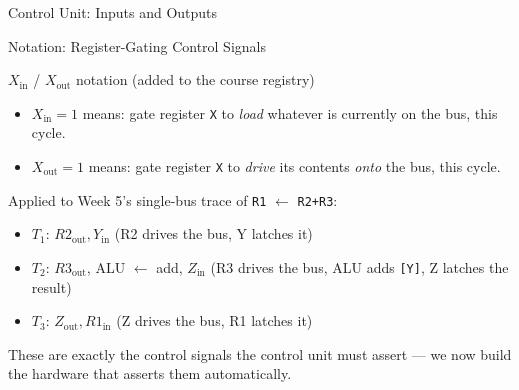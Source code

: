 \documentclass[aspectratio=169]{beamer}
\begin{document}
\begin{frame}{Control Unit: Inputs and Outputs}
\begin{center}
  \end{center}
  \cite{Hamacher2002_computer_organization}
\end{frame}

\begin{frame}{Notation: Register-Gating Control Signals}
  \begin{block}{$X_{\text{in}}$ / $X_{\text{out}}$ notation (added to the course registry)}
    \begin{itemize}
      \item $X_{\text{in}} = 1$ \quad means: gate register \texttt{X} to \emph{load} whatever
        is currently on the bus, this cycle.
      \item $X_{\text{out}} = 1$ \quad means: gate register \texttt{X} to \emph{drive} its
        contents \emph{onto} the bus, this cycle.
    \end{itemize}
  \end{block}
  Applied to Week 5's single-bus trace of \texttt{R1} $\gets$ \texttt{R2+R3}:
  \begin{itemize}
    \item $T_1$: $R2_{\text{out}}, Y_{\text{in}}$ \quad (R2 drives the bus, Y latches it)
    \item $T_2$: $R3_{\text{out}}$, ALU $\gets$ add, $Z_{\text{in}}$ \quad (R3 drives the bus, ALU adds \texttt{[Y]}, Z latches the result)
    \item $T_3$: $Z_{\text{out}}, R1_{\text{in}}$ \quad (Z drives the bus, R1 latches it)
  \end{itemize}
  These are exactly the control signals the control unit must assert --- we now
  build the hardware that asserts them automatically.
\end{frame}
\end{document}
